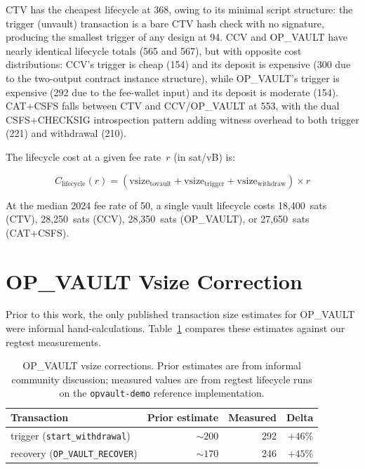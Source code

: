 CTV has the cheapest lifecycle at 368\vB{}, owing to its minimal script structure: the
trigger (unvault) transaction is a bare CTV hash check with no signature, producing
the smallest trigger of any design at 94\vB{}. CCV and OP\_VAULT have nearly identical
lifecycle totals (565 and 567\vB{}), but with opposite cost distributions: CCV's
trigger is cheap (154\vB{}) and its deposit is expensive (300\vB{} due to the
two-output contract instance structure), while OP\_VAULT's trigger is expensive
(292\vB{} due to the fee-wallet input) and its deposit is moderate (154\vB{}).
CAT+CSFS falls between CTV and CCV/OP\_VAULT at 553\vB{}, with the dual CSFS+CHECKSIG
introspection pattern adding witness overhead to both trigger (221\vB{}) and withdrawal
(210\vB{}).

The lifecycle cost at a given fee rate~$r$ (in sat/vB) is:

\begin{equation} \label{eq:lifecycle_cost}
C_{\text{lifecycle}}(r) = (\text{vsize}_{\text{tovault}} + \text{vsize}_{\text{trigger}}
  + \text{vsize}_{\text{withdraw}}) \times r
\end{equation}

\noindent
At the median 2024 fee rate of 50\satvB{}, a single vault lifecycle costs 18{,}400~sats
(CTV), 28{,}250~sats (CCV), 28{,}350~sats (OP\_VAULT), or 27{,}650~sats (CAT+CSFS).

\section{OP\_VAULT Vsize Correction} \label{se:opvault_correction}

Prior to this work, the only published transaction size estimates for OP\_VAULT were
informal hand-calculations. Table~\ref{tab:opvault_correction} compares these estimates
against our regtest measurements.

\begin{table}[t]
\centering
\caption{OP\_VAULT vsize corrections. Prior estimates are from informal community
discussion; measured values are from regtest lifecycle runs on the
\texttt{opvault-demo} reference implementation.}
\label{tab:opvault_correction}
\begin{tabular}{@{}lrrr@{}}
\toprule
Transaction & Prior estimate & Measured & Delta \\
\midrule
trigger (\texttt{start\_withdrawal})  & ${\sim}200$\vB{} & 292\vB{} & $+46\%$ \\
recovery (\texttt{OP\_VAULT\_RECOVER}) & ${\sim}170$\vB{} & 246\vB{} & $+45\%$ \\
\bottomrule
\end{tabular}
\end{table}

